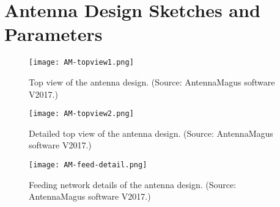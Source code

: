 
\chapter{Antenna Design Sketches and Parameters}\label{sketch-param}
% 
%
%
\begin{figure}[!htbp]
 \begin{center}
  \texttt{[image: AM-topview1.png]}
 \end{center}
 \caption{Top view of the antenna design. (Source: AntennaMagus software V2017.)}
  \label{fig:tp1}
\end{figure}
% 
%
%



% 
%
%
\begin{figure}[!htbp]
 \begin{center}
  \texttt{[image: AM-topview2.png]}
 \end{center}
 \caption{Detailed top view of the antenna design. (Source: AntennaMagus software V2017.)}
  \label{fig:tp2}
\end{figure}
% 
%
%



% 
%
%
\begin{figure}[!htbp]
 \begin{center}
  \texttt{[image: AM-feed-detail.png]}
 \end{center}
 \caption{Feeding network details of the antenna design. (Source: AntennaMagus software V2017.)}
  \label{fig:feed-detail}
\end{figure}
% 
%
%
% 
%   
%   
% 
% 
% 
% 



